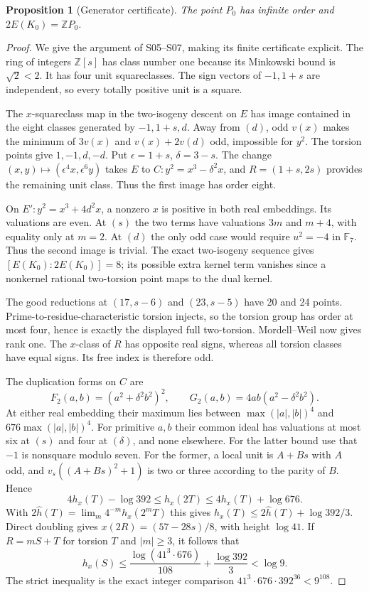 \documentclass[11pt]{article}
\newtheorem{proposition}[theorem]{Proposition}
\theoremstyle{definition}
\theoremstyle{remark}
\newcommand{\Z}{\mathbb Z}
\newcommand{\F}{\mathbb F}
\begin{document}
\begin{proposition}[Generator certificate]\label{prop:generator}
The point $P_0$ has infinite order and $2E(K_0)=\Z P_0$.
\end{proposition}
\begin{proof}
We give the argument of S05--S07, making its finite certificate explicit.
The ring of integers $\Z[s]$ has class number one because its Minkowski
bound is $\sqrt2<2$. It has four unit squareclasses. The sign vectors
of $-1,1+s$ are independent, so every totally positive unit is a square.

The $x$-squareclass map in the two-isogeny descent on $E$ has image
contained in the eight classes generated by $-1,1+s,d$. Away from $(d)$,
odd $v(x)$ makes the minimum of $3v(x)$ and $v(x)+2v(d)$ odd, impossible
for $y^2$. The torsion points give $1,-1,d,-d$. Put $\epsilon=1+s$,
$\delta=3-s$. The change $(x,y)\mapsto(\epsilon^4x,\epsilon^6y)$ takes
$E$ to $C:y^2=x^3-\delta^2x$, and $R=(1+s,2s)$ provides the remaining
unit class. Thus the first image has order eight.

On $E':y^2=x^3+4d^2x$, a nonzero $x$ is positive in both real embeddings.
Its valuations are even. At $(s)$ the two terms have valuations $3m$
and $m+4$, with equality only at $m=2$. At $(d)$ the only odd case
would require $u^2=-4$ in $\F_7$. Thus the second image is trivial.
The exact two-isogeny sequence gives $[E(K_0):2E(K_0)]=8$; its possible
extra kernel term vanishes since a nonkernel rational two-torsion point
maps to the dual kernel.

The good reductions at $(17,s-6)$ and $(23,s-5)$ have 20 and 24 points.
Prime-to-residue-characteristic torsion injects, so the torsion group
has order at most four, hence is exactly the displayed full two-torsion. Mordell--Weil now gives rank one.
The $x$-class of $R$ has opposite real signs, whereas all torsion classes
have equal signs. Its free index is therefore odd.

The duplication forms on $C$ are
\[
 F_2(a,b)=(a^2+\delta^2b^2)^2,\qquad
 G_2(a,b)=4ab(a^2-\delta^2b^2).
\]
At either real embedding their maximum lies between
$\max(|a|,|b|)^4$ and $676\max(|a|,|b|)^4$. For primitive $a,b$ their
common ideal has valuations at most six at $(s)$ and four at $(\delta)$,
and none elsewhere. For the latter bound use that $-1$ is nonsquare
modulo seven. For the former, a local unit is $A+Bs$ with $A$ odd, and
$v_s((A+Bs)^2+1)$ is two or three according to the parity of $B$.
Hence
\[
 4h_x(T)-\log392\le h_x(2T)\le4h_x(T)+\log676.
\]
With $2\widehat h(T)=\lim_m4^{-m}h_x(2^mT)$ this gives
$h_x(T)\le2\widehat h(T)+\log392/3$. Direct doubling gives
$x(2R)=(57-28s)/8$, with height $\log41$. If $R=mS+T$ for torsion
$T$ and $|m|\ge3$, it follows that
\[
 h_x(S)\le\frac{\log(41^3\cdot676)}{108}+\frac{\log392}{3}<\log9.
\]
The strict inequality is the exact integer comparison
$41^3\cdot676\cdot392^{36}<9^{108}$.


\end{proof}
\end{document}
